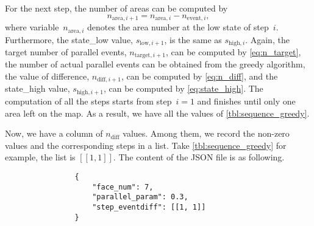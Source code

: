 \documentclass[ijgi,article,submit,moreauthors,pdftex]{Definitions/mdpi}
\begin{document}
For the next step, the number of areas can be computed by
$$
n_{\mathrm{area},i+1} = n_{\mathrm{area},i} - n_{\mathrm{event},i},
$$
where variable~$n_{\mathrm{area},i}$ denotes the area number 
at the low state of step~$i$.
Furthermore, the state\_low value, $s_{\mathrm{low},i+1}$, is the same as  
$s_{\mathrm{high},i}$.
Again, the target number of parallel events, $n_{\mathrm{target},i+1}$,
can be computed by \eq\ref{eq:n_target},
the number of actual parallel events can be obtained from the greedy algorithm,
the value of difference, $n_{\mathrm{diff},i+1}$, 
can be computed by \eq\ref{eq:n_diff}, 
and the state\_high value, $s_{\mathrm{high},i+1}$, 
can be computed by \eq\ref{eq:state_high}.
The computation of all the steps starts from step~$i=1$ and 
finishes until only one area left on the map.
As a result, we have all the values of \tbl\ref{tbl:sequence_greedy}.



Now, we have a column of $n_\mathrm{diff}$ values.
Among them, we record the non-zero values and the corresponding steps in a list.
Take \tbl\ref{tbl:sequence_greedy} for example,
the list is $[[1, 1]]$.
The content of the JSON file is as following.
\begin{verbatim}
                {
                    "face_num": 7,
                    "parallel_param": 0.3,                    
                    "step_eventdiff": [[1, 1]]
                }
\end{verbatim}
\end{document}
